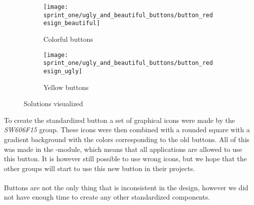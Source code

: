 \begin{figure}[!htbp]
    \centering

    \begin{subfigure}[t]{0.3\textwidth}
    	\centering
        \texttt{[image: sprint\_one/ugly\_and\_beautiful\_buttons/button\_redesign\_beautiful]}
        \caption{Colorful buttons}
        \label{fig:ugly_and_beautiful_buttons_example_one}
    \end{subfigure}
    \hspace{5em} 
    \begin{subfigure}[t]{0.3\textwidth}
    	\centering
        \texttt{[image: sprint\_one/ugly\_and\_beautiful\_buttons/button\_redesign\_ugly]}
        \caption{Yellow buttons}
        \label{fig:ugly_and_beautiful_buttons_example_two}
    \end{subfigure}
    
    \caption{Solutions visualized}
    \label{fig:ugly_and_beautiful_buttons_example_solution}
\end{figure}

To create the standardized button a set of graphical icons were made by the \emph{SW606F15} group. These icons were then combined with a rounded square with a gradient background with the colors corresponding to the old buttons. All of this was made in the -module, which means that all applications are allowed to use this button. It is however still possible to use wrong icons, but we hope that the other groups will start to use this new button in their projects.
\\\\
Buttons are not the only thing that is inconsistent in the design, however we did not have enough time to create any other standardized components. 
